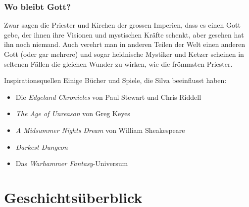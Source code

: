 \documentclass[12pt,twoside,twocolumn,openany]{book}
\begin{document}
\subsubsection{Wo bleibt Gott?}
Zwar sagen die Priester und Kirchen der grossen Imperien, dass es einen Gott gebe, der ihnen ihre Visionen und mystischen Kräfte schenkt, aber gesehen hat ihn noch niemand. Auch verehrt man in anderen Teilen der Welt einen anderen Gott (oder gar mehrere) und sogar heidnische Mystiker und Ketzer scheinen in seltenen Fällen die gleichen Wunder zu wirken, wie die frömmsten Priester.

\begin{table}[h]
	\begin{commentbox}{Inspirationsquellen}
		Einige Bücher und Spiele, die Silva beeinflusst haben:
		\begin{itemize}
			\item Die \emph{Edgeland Chronicles} von Paul Stewart und Chris Riddell
			\item \emph{The Age of Unreason} von Greg Keyes
			\item \emph{A Midsummer Nights Dream} von William Sheakespeare
			\item \emph{Darkest Dungeon}
			\item  Das \emph{Warhammer Fantasy}-Universum
		\end{itemize}
	\end{commentbox}
\end{table}


\section{Geschichtsüberblick}
	
\end{document}

